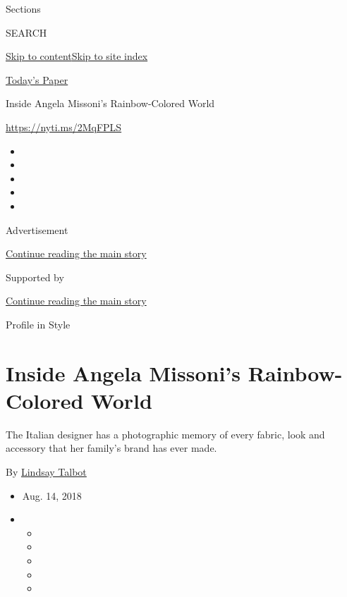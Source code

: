 Sections

SEARCH

\protect\hyperlink{site-content}{Skip to
content}\protect\hyperlink{site-index}{Skip to site index}

\href{https://myaccount.nytimes3xbfgragh.onion/auth/login?response_type=cookie\&client_id=vi}{}

\href{https://www.nytimes3xbfgragh.onion/section/todayspaper}{Today's
Paper}

Inside Angela Missoni's Rainbow-Colored World

\url{https://nyti.ms/2MqFPLS}

\begin{itemize}
\item
\item
\item
\item
\item
\end{itemize}

Advertisement

\protect\hyperlink{after-top}{Continue reading the main story}

Supported by

\protect\hyperlink{after-sponsor}{Continue reading the main story}

Profile in Style

\hypertarget{inside-angela-missonis-rainbow-colored-world}{%
\section{Inside Angela Missoni's Rainbow-Colored
World}\label{inside-angela-missonis-rainbow-colored-world}}

The Italian designer has a photographic memory of every fabric, look and
accessory that her family's brand has ever made.

By \href{https://www.nytimes3xbfgragh.onion/by/lindsay-talbot}{Lindsay
Talbot}

\begin{itemize}
\item
  Aug. 14, 2018
\item
  \begin{itemize}
  \item
  \item
  \item
  \item
  \item
  \end{itemize}
\end{itemize}


